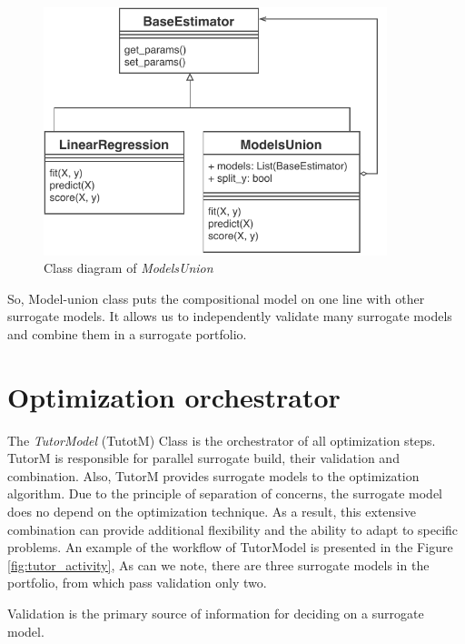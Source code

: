     \begin{figure}
        \centering
        \includegraphics[width=10cm]{content/images/munion_class}
        \caption[Models-union class]{Class diagram of \textit{ModelsUnion}} 
        \label{fig:munion} 
    \end{figure}  

    So, Model-union class puts the compositional model on one line with other surrogate models. It allows us to independently validate many surrogate models and combine them in a surrogate portfolio.

\section{Optimization orchestrator}
    The \textit{TutorModel} (TutotM) Class is the orchestrator of all optimization steps. TutorM is responsible for parallel surrogate build, their validation and combination. Also, TutorM provides surrogate models to the optimization algorithm. Due to the principle of separation of concerns, the surrogate model does no depend on the optimization technique. As a result, this extensive combination can provide additional flexibility and the ability to adapt to specific problems. An example of the workflow of TutorModel is presented in the Figure \ref{fig:tutor_activity}, As can we note, there are three surrogate models in the portfolio, from which pass validation only two.
    
    Validation is the primary source of information for deciding on a surrogate model.


